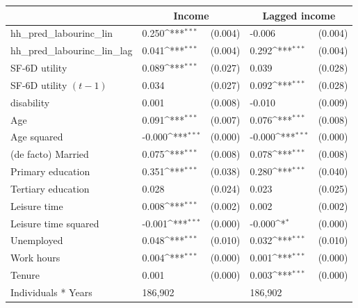 {
\def\sym#1{\ifmmode^{#1}\else\(^{#1}\)\fi}
\begin{tabular}{l*{2}{lc}}
\hline\hline
                    &\multicolumn{2}{c}{\textbf{Income}}&\multicolumn{2}{c}{\textbf{Lagged income}}\\
\hline
hh\_pred\_labourinc\_lin&       0.250\sym{***}&     (0.004)&      -0.006         &     (0.004)\\
hh\_pred\_labourinc\_lin\_lag&       0.041\sym{***}&     (0.004)&       0.292\sym{***}&     (0.004)\\
SF-6D utility       &       0.089\sym{***}&     (0.027)&       0.039         &     (0.028)\\
SF-6D utility $(t-1)$&       0.034         &     (0.027)&       0.092\sym{***}&     (0.028)\\
disability          &       0.001         &     (0.008)&      -0.010         &     (0.009)\\
Age                 &       0.091\sym{***}&     (0.007)&       0.076\sym{***}&     (0.008)\\
Age squared         &      -0.000\sym{***}&     (0.000)&      -0.000\sym{***}&     (0.000)\\
(de facto) Married  &       0.075\sym{***}&     (0.008)&       0.078\sym{***}&     (0.008)\\
Primary education   &       0.351\sym{***}&     (0.038)&       0.280\sym{***}&     (0.040)\\
Tertiary education  &       0.028         &     (0.024)&       0.023         &     (0.025)\\
Leisure time        &       0.008\sym{***}&     (0.002)&       0.002         &     (0.002)\\
Leisure time squared&      -0.001\sym{***}&     (0.000)&      -0.000\sym{*}  &     (0.000)\\
Unemployed          &       0.048\sym{***}&     (0.010)&       0.032\sym{***}&     (0.010)\\
Work hours          &       0.004\sym{***}&     (0.000)&       0.001\sym{***}&     (0.000)\\
Tenure              &       0.001         &     (0.000)&       0.003\sym{***}&     (0.000)\\
\hline
Individuals * Years &     186,902         &            &     186,902         &            \\
\hline\hline
\end{tabular}
}
